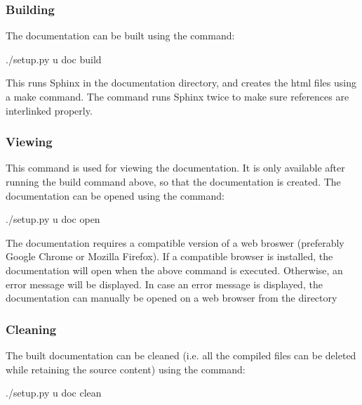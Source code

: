 \documentclass[letterpaper,10pt,english]{sphinxmanual}
\begin{document}
\subsubsection{Building}
\label{\detokenize{couettepyfiles/documentation:building}}
The documentation can be built using the command:

\begin{sphinxVerbatim}[commandchars=\\\{\}]
\PYGZdl{} ./setup.py \PYGZhy{}u doc build
\end{sphinxVerbatim}

This runs Sphinx in the documentation directory, and creates the html files using a make command. The command runs Sphinx twice to make sure references are interlinked properly.


\subsubsection{Viewing}
\label{\detokenize{couettepyfiles/documentation:viewing}}
This command is used for viewing the documentation. It is only available after running the build command above, so that the documentation is created. The documentation can be opened using the command:

\begin{sphinxVerbatim}[commandchars=\\\{\}]
\PYGZdl{} ./setup.py \PYGZhy{}u doc open
\end{sphinxVerbatim}

The documentation requires a compatible version of a web broswer (preferably Google Chrome or Mozilla Firefox). If a compatible browser is installed, the documentation will open when the above command is executed. Otherwise, an error message will be displayed. In case an error message is displayed, the documentation can manually be opened on a web browser from the directory 


\subsubsection{Cleaning}
\label{\detokenize{couettepyfiles/documentation:cleaning}}
The built documentation can be cleaned (i.e. all the compiled files can be deleted while retaining the source content) using the command:

\begin{sphinxVerbatim}[commandchars=\\\{\}]
\PYGZdl{} ./setup.py \PYGZhy{}u doc clean
\end{sphinxVerbatim}
\end{document}
